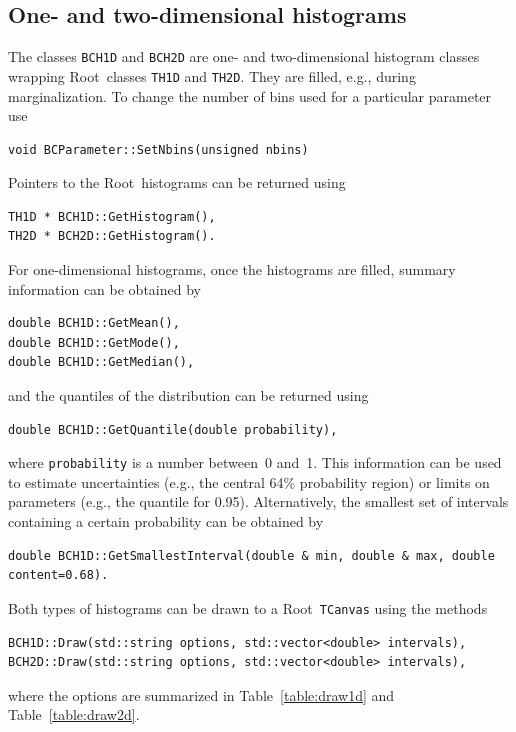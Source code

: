 \documentclass[11pt, a4paper]{article}
\newcommand{\Root}{{\sc Root}}
\begin{document}

\subsection{One- and two-dimensional histograms}

The classes \verb|BCH1D| and \verb|BCH2D| are one- and two-dimensional
histogram classes wrapping \Root\ classes \verb|TH1D| and
\verb|TH2D|. They are filled, e.g., during marginalization. To change
the number of bins used for a particular parameter use
%
\begin{verbatim}
void BCParameter::SetNbins(unsigned nbins)
\end{verbatim}
%
Pointers to the \Root\ histograms can be returned
using
%
\begin{verbatim}
TH1D * BCH1D::GetHistogram(),
TH2D * BCH2D::GetHistogram().
\end{verbatim}
%
For one-dimensional histograms, once the histograms are filled,
summary information can be obtained by
%
\begin{verbatim}
double BCH1D::GetMean(),
double BCH1D::GetMode(),
double BCH1D::GetMedian(),
\end{verbatim}
%
and the quantiles of the distribution can be returned using
%
\begin{verbatim}
double BCH1D::GetQuantile(double probability),
\end{verbatim}
%
where \verb|probability| is a number between~0 and~1. This information
can be used to estimate uncertainties (e.g., the central 64\%
probability region) or limits on parameters (e.g., the quantile for
0.95). Alternatively, the smallest set of intervals containing a
certain probability can be obtained by
%
\begin{verbatim}
double BCH1D::GetSmallestInterval(double & min, double & max, double content=0.68).
\end{verbatim}

Both types of histograms can be drawn to a \Root\ \verb|TCanvas| using
the methods
%
\begin{verbatim}
BCH1D::Draw(std::string options, std::vector<double> intervals),
BCH2D::Draw(std::string options, std::vector<double> intervals),
\end{verbatim}
%
where the options are summarized in Table~\ref{table:draw1d} and
Table~\ref{table:draw2d}.
\end{document}
